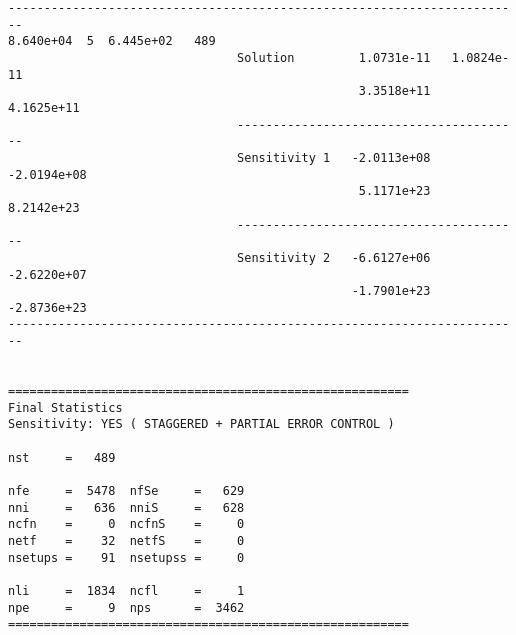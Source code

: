 \begin{verbatim}
------------------------------------------------------------------------
8.640e+04  5  6.445e+02   489
                                Solution         1.0731e-11   1.0824e-11 
                                                 3.3518e+11   4.1625e+11 
                                ----------------------------------------
                                Sensitivity 1   -2.0113e+08  -2.0194e+08 
                                                 5.1171e+23   8.2142e+23 
                                ----------------------------------------
                                Sensitivity 2   -6.6127e+06  -2.6220e+07 
                                                -1.7901e+23  -2.8736e+23 
------------------------------------------------------------------------


========================================================
Final Statistics
Sensitivity: YES ( STAGGERED + PARTIAL ERROR CONTROL )

nst     =   489 

nfe     =  5478  nfSe     =   629 
nni     =   636  nniS     =   628 
ncfn    =     0  ncfnS    =     0 
netf    =    32  netfS    =     0 
nsetups =    91  nsetupss =     0 

nli     =  1834  ncfl     =     1 
npe     =     9  nps      =  3462 
========================================================
\end{verbatim}